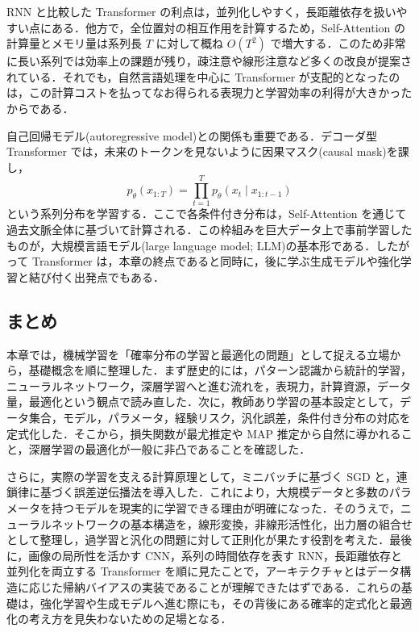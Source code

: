 RNN と比較した Transformer の利点は，並列化しやすく，長距離依存を扱いやすい点にある．他方で，全位置対の相互作用を計算するため，Self-Attention の計算量とメモリ量は系列長 $T$ に対して概ね $O(T^2)$ で増大する．このため非常に長い系列では効率上の課題が残り，疎注意や線形注意など多くの改良が提案されている．それでも，自然言語処理を中心に Transformer が支配的となったのは，この計算コストを払ってなお得られる表現力と学習効率の利得が大きかったからである．

自己回帰モデル(autoregressive model)との関係も重要である．デコーダ型 Transformer では，未来のトークンを見ないように因果マスク(causal mask)を課し，
\[
p_\theta(x_{1:T})
= \prod_{t=1}^T p_\theta(x_t\mid x_{1:t-1})
\]
という系列分布を学習する．ここで各条件付き分布は，Self-Attention を通じて過去文脈全体に基づいて計算される．この枠組みを巨大データ上で事前学習したものが，大規模言語モデル(large language model; LLM)の基本形である．したがって Transformer は，本章の終点であると同時に，後に学ぶ生成モデルや強化学習と結び付く出発点でもある．

\subsection*{まとめ}
本章では，機械学習を「確率分布の学習と最適化の問題」として捉える立場から，基礎概念を順に整理した．まず歴史的には，パターン認識から統計的学習，ニューラルネットワーク，深層学習へと進む流れを，表現力，計算資源，データ量，最適化という観点で読み直した．次に，教師あり学習の基本設定として，データ集合，モデル，パラメータ，経験リスク，汎化誤差，条件付き分布の対応を定式化した．そこから，損失関数が最尤推定や MAP 推定から自然に導かれること，深層学習の最適化が一般に非凸であることを確認した．

さらに，実際の学習を支える計算原理として，ミニバッチに基づく SGD と，連鎖律に基づく誤差逆伝播法を導入した．これにより，大規模データと多数のパラメータを持つモデルを現実的に学習できる理由が明確になった．そのうえで，ニューラルネットワークの基本構造を，線形変換，非線形活性化，出力層の組合せとして整理し，過学習と汎化の問題に対して正則化が果たす役割を考えた．最後に，画像の局所性を活かす CNN，系列の時間依存を表す RNN，長距離依存と並列化を両立する Transformer を順に見たことで，アーキテクチャとはデータ構造に応じた帰納バイアスの実装であることが理解できたはずである．これらの基礎は，強化学習や生成モデルへ進む際にも，その背後にある確率的定式化と最適化の考え方を見失わないための足場となる．

\nocite{Bishop2006,Murphy2012,Goodfellow2016,Hastie2009,Vapnik1998,RobbinsMonro1951,Boyd2004,Rumelhart1986,LeCun1998,Krizhevsky2012,He2016,Srivastava2014,Ioffe2015,Hochreiter1997,Bahdanau2015,Vaswani2017}


